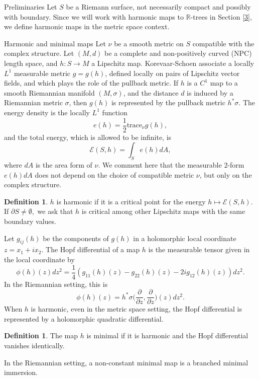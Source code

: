 \documentclass[10pt]{amsart}
\newcommand{\R}{\mathbb R}
\theoremstyle{definition}
\newtheorem{defn}[thm]{Definition}
\begin{document}
\begin{section}{Preliminaries}\label{2}
Let $S$ be a Riemann surface, not necessarily compact and possibly with boundary. Since we will work with harmonic maps to $\R$-trees in Section \ref{3}, we define harmonic maps in the metric space context.
\begin{subsection}{Harmonic and minimal maps}
 Let $\nu$ be a smooth metric on $S$ compatible with the complex structure. Let $(M,d)$ be a complete and non-positively curved (NPC) length space, and $h:S\to M$ a Lipschitz map. Korevaar-Schoen \cite[Theorem 2.3.2]{KS} associate a locally $L^1$ measurable metric $g=g(h)$, defined locally on pairs of Lipschitz vector fields, and which plays the role of the pullback metric. If $h$ is a $C^1$ map to a smooth Riemannian manifold $(M,\sigma)$, and the distance $d$ is induced by a Riemannian metric $\sigma$, then $g(h)$ is represented by
the pullback metric $h^*\sigma$. The energy density is the locally $L^1$ function 
\begin{equation}\label{mease}
    e(h)=\frac{1}{2}\textrm{trace}_\nu g(h),
\end{equation}
and the total energy, which is allowed to be infinite,
is
\begin{equation}\label{tot}
    \mathcal{E}(S,h) = \int_S e(h)dA,
\end{equation}
where $dA$ is the area form of $\nu$. We comment here that the measurable $2$-form $e(h)dA$ does not depend on the choice of compatible metric $\nu$, but only on the complex structure. 

\begin{defn}
$h$ is harmonic if it is a critical point for the energy $h\mapsto \mathcal{E}(S,h)$. If $\partial S\neq \emptyset,$ we ask that $h$ is critical among other Lipschitz maps with the same boundary values.
\end{defn}
Let $g_{ij}(h)$ be the components of $g(h)$ in a holomorphic local coordinate $z=x_1+ix_2$. The Hopf differential of a map $h$ is the measurable tensor given in the local coordinate by
\begin{equation}\label{mhopf}
\phi(h)(z)dz^2=\frac{1}{4}(g_{11}(h)(z)-g_{22}(h)(z)-2ig_{12}(h)(z))dz^2.
\end{equation}
In the Riemannian setting, this is 
$$
\phi(h)(z) = h^*\sigma\Big (\frac{\partial}{\partial z},\frac{\partial}{\partial z}\Big )(z)dz^2.$$
When $h$ is harmonic, even in the metric space setting, the Hopf differential is represented by a holomorphic quadratic differential.
\begin{defn}
The map $h$ is minimal if it is harmonic and the Hopf differential vanishes identically.
\end{defn}
In the Riemannian setting, a non-constant minimal map is a branched minimal immersion.


\end{subsection}
\end{section}
\end{document}
